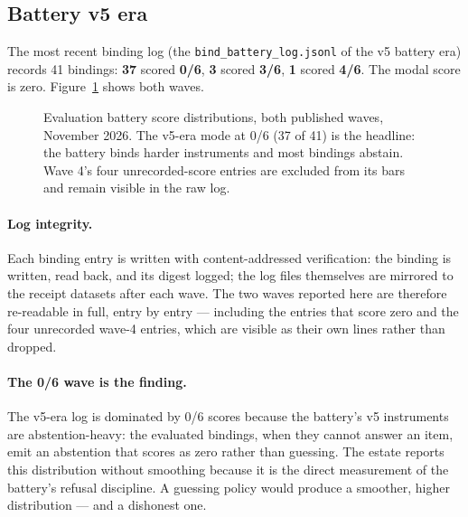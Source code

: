 ﻿\documentclass[11pt]{article}
\begin{document}
\subsection{Battery v5 era}
The most recent binding log (the \texttt{bind\_battery\_log.jsonl} of the v5 battery era) records 41 bindings: \textbf{37} scored \textbf{0/6}, \textbf{3} scored \textbf{3/6}, \textbf{1} scored \textbf{4/6}. The modal score is zero. Figure~\ref{fig:battery} shows both waves.

\begin{figure}[htbp]
\centering
{}
\caption{Evaluation battery score distributions, both published waves, November 2026. The v5-era mode at 0/6 (37 of 41) is the headline: the battery binds harder instruments and most bindings abstain. Wave 4's four unrecorded-score entries are excluded from its bars and remain visible in the raw log.}
\label{fig:battery}
\end{figure}

\paragraph{Log integrity.} Each binding entry is written with content-addressed verification: the binding is written, read back, and its digest logged; the log files themselves are mirrored to the receipt datasets after each wave. The two waves reported here are therefore re-readable in full, entry by entry --- including the entries that score zero and the four unrecorded wave-4 entries, which are visible as their own lines rather than dropped.

\paragraph{The 0/6 wave is the finding.} The v5-era log is dominated by 0/6 scores because the battery's v5 instruments are abstention-heavy: the evaluated bindings, when they cannot answer an item, emit an abstention that scores as zero rather than guessing. The estate reports this distribution without smoothing because it is the direct measurement of the battery's refusal discipline. A guessing policy would produce a smoother, higher distribution --- and a dishonest one.
\end{document}
